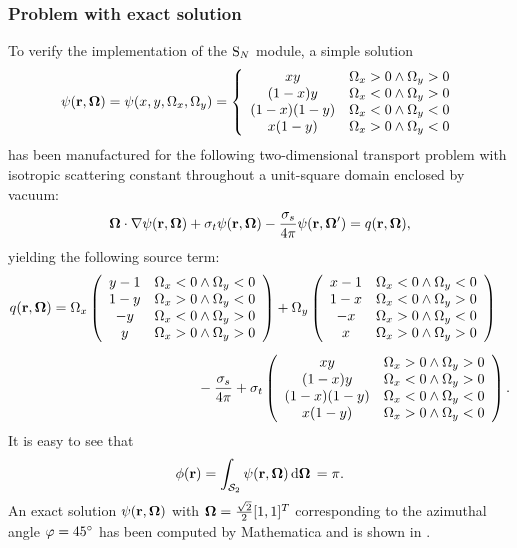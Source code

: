 \subsubsection{Problem with exact solution}
To verify the implementation of the $\text{S}_{N}$ module, a simple solution
\begin{equation}\label{eq:1sol}
	\psi(\mathbf{r},\mathbf{\Omega}) = \psi(x,y,\Omega_x,\Omega_y) = \left
 \{ 
\begin{array}{cc}
 x y & \Omega _x>0\land \Omega _y>0 \\
 (1-x) y & \Omega _x<0\land \Omega _y>0 \\
 (1-x) (1-y) & \Omega _x<0\land \Omega _y<0 \\
 x (1-y) & \Omega _x>0\land \Omega _y<0 \\
\end{array}
 \right.
\end{equation}
has been manufactured for the following two-dimensional transport
problem with isotropic scattering constant throughout a unit-square domain enclosed by vacuum:
\begin{equation*}
    \mathbf{\Omega}\cdot\nabla\psi(\mathbf{r},\mathbf{\Omega}) + \sigma_t\psi(\mathbf{r},\mathbf{\Omega}) -
    \frac{\sigma_s}{4\pi} \psi(\mathbf{r},\mathbf{\Omega}') =
    q(\mathbf{r},\mathbf{\Omega}),
\end{equation*}
yielding the following source term: 
$$
\begin{multlined}
q(\br,\bomega) =
\Omega _x \left(
\begin{array}{cc}
 y-1 & \Omega _x<0\land \Omega _y<0 \\
 1-y & \Omega _x>0\land \Omega _y<0 \\
 -y & \Omega _x<0\land \Omega _y>0 \\
 y & \Omega _x>0\land \Omega _y>0 \\
\end{array}
\right)+\Omega _y \left(
\begin{array}{cc}
 x-1 & \Omega _x<0\land \Omega _y<0 \\
 1-x & \Omega _x<0\land \Omega _y>0 \\
 -x & \Omega _x>0\land \Omega _y<0 \\
 x & \Omega _x>0\land \Omega _y>0 \\
\end{array}
\right)\\[.5em]
- \frac{\sigma _s}{4\pi}+\sigma _t \left(
\begin{array}{cc}
 x y & \Omega _x>0\land \Omega _y>0 \\
 (1-x) y & \Omega _x<0\land \Omega _y>0 \\
 (1-x) (1-y) & \Omega _x<0\land \Omega _y<0 \\
 x (1-y) & \Omega _x>0\land \Omega _y<0 \\
\end{array}
\right).
\end{multlined}
$$
It is easy to see that
$$
	\phi(\mathbf{r}) = \int_{\mathcal{S}_2}\psi(\mathbf{r},\mathbf{\Omega})\,\text{d}\mathbf{\Omega}\, = \pi.
$$
An exact solution $\psi(\mathbf{r},\mathbf{\Omega})$ with $\mathbf{\Omega} = \frac{\sqrt{2}}{2} [1,1]^T$ corresponding to the azimuthal
angle $\varphi = 45^\circ$ has been computed by Mathematica and is shown in .

